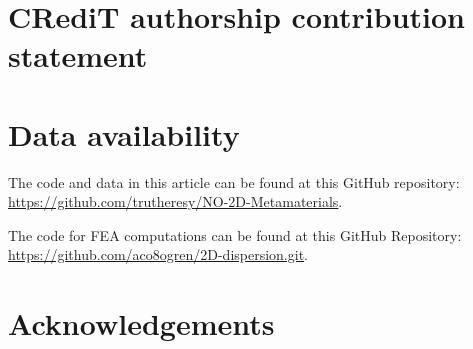 \documentclass[preprint,review,12pt]{elsarticle}
\begin{document}
\section*{CRediT authorship contribution statement}


\section*{Data availability}
\label{sec:Repository}
The code and data in this article can be found at this GitHub repository:
\url{https://github.com/trutheresy/NO-2D-Metamaterials}.

The code for FEA computations can be found at this GitHub Repository:
\url{https://github.com/aco8ogren/2D-dispersion.git}.

\section*{Acknowledgements}





% 






\end{document}
